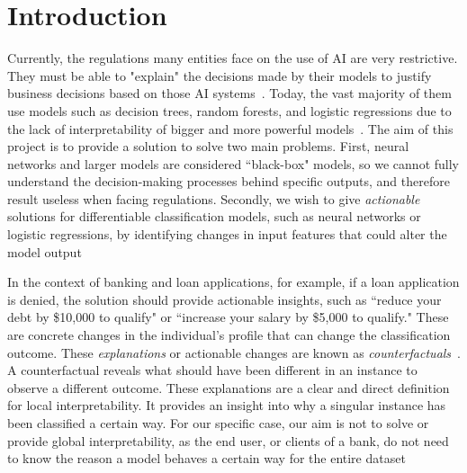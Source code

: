 \documentclass[12pt]{extarticle}
\numberwithin{equation}{section}
\begin{document}
\newpage
\tableofcontents  %
\thispagestyle{fancy}

\newpage

\renewcommand{\footrulewidth}{0.4pt}  %
\setcounter{page}{1}  %
\fancyfoot[C]{
    \begin{center}
        \thepage
    \end{center}
}  %
\setlength{\footskip}{0.8cm}  %

\section{Introduction}
Currently, the regulations many entities face on the use of AI are very restrictive. They must be able to "explain" the decisions made by their models to justify business decisions based on those AI systems~\cite{cohen2021black}. Today, the vast majority of them use models such as decision trees, random forests, and logistic regressions due to the lack of interpretability 
of bigger and more powerful models~\cite{ghatasheh2014business,pointofview}. The aim of this project is to provide a solution to solve two main problems. First, neural networks and larger models are considered ``black-box" models, so we cannot fully understand the decision-making processes behind specific outputs, and therefore result useless when facing regulations. Secondly, we wish to give \emph{actionable} solutions for differentiable classification models, such as neural networks or logistic regressions, by identifying changes in input features that could alter the model output

In the context of banking and loan applications, for example, if a loan application is denied, the solution should provide actionable insights, such as ``reduce your debt by \$10,000 to qualify" or ``increase your salary by \$5,000 to qualify." These are concrete changes in the individual's profile that can change the classification outcome. These \emph{explanations} or actionable changes are known as \emph{counterfactuals}~\cite{wachter2017counterfactual,guidotti2024counterfactual}. A counterfactual reveals what should have been different in an instance to observe a different outcome. These explanations are a clear and direct definition for local interpretability. It provides an insight into why a singular instance has been classified a certain way. For our specific case, our aim is not to solve or provide global interpretability, as the end user, or clients of a bank, do not need to know the reason a model behaves a certain way for the entire dataset
\end{document}
